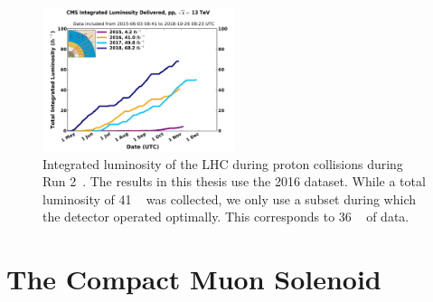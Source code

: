 \begin{figure}[]
    \begin{center}
        \includegraphics[width=0.5\textwidth]{figures/cms/lumi.pdf}
        \caption{Integrated luminosity of the LHC during proton collisions during Run 2~\cite{lumitwiki}.
	         The results in this thesis use the 2016 dataset.
		 While a total luminosity of 41 \fbinv~ was collected, we only use a subset during which the detector operated optimally.
		 This corresponds to 36 \fbinv~ of data.}
        \label{fig:cms:lumi}
    \end{center}
\end{figure}

\section{The Compact Muon Solenoid}


